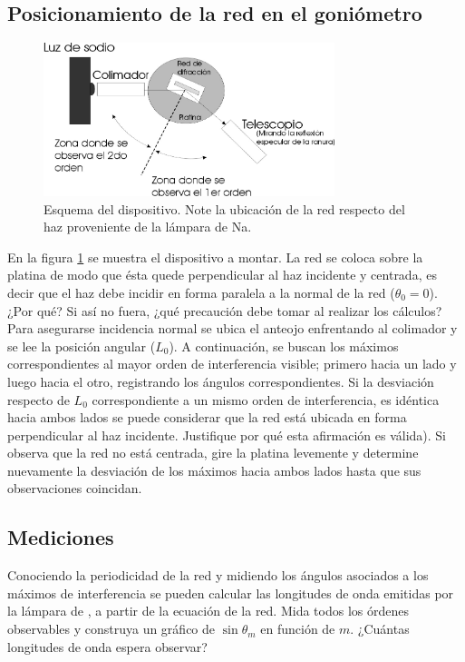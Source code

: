 \documentclass[laboratorio]{guia}
\begin{document}
\subsection{Posicionamiento de la red en el goniómetro} %
\begin{figure}[t!]
    \centering
    \includegraphics[width=8.5cm]{LG11--002.png}
    \caption{Esquema del dispositivo.
      Note la ubicación de la red respecto del haz proveniente de la lámpara de Na.
    }
    \label{fig:1}
\end{figure}
En la figura \ref{fig:1} se muestra el dispositivo a montar.
La red se coloca sobre la platina de modo que ésta quede perpendicular al haz incidente y centrada, es decir que el haz debe incidir en forma paralela a la normal de la red (\(\theta_0 = 0\)).
¿Por qué?
Si así no fuera, ¿qué precaución debe tomar al realizar los cálculos?
Para asegurarse incidencia normal se ubica el anteojo enfrentando al colimador y se lee la posición angular (\(L_0\)).
A continuación, se buscan los máximos correspondientes al mayor orden de interferencia visible; primero hacia un lado y luego hacia el otro, registrando los ángulos correspondientes.
Si la desviación respecto de \(L_0\) correspondiente a un mismo orden de interferencia, es idéntica hacia ambos lados se puede considerar que la red está ubicada en forma perpendicular al haz incidente.
Justifique por qué esta afirmación es válida).
Si observa que la red no está centrada, gire la platina levemente y determine nuevamente la desviación de los máximos hacia ambos lados hasta que sus observaciones coincidan.


\subsection{Mediciones}
  Conociendo la periodicidad de la red y midiendo los ángulos asociados a los  máximos de interferencia se pueden calcular las longitudes de onda emitidas por la lámpara de , a partir de la ecuación de la red.
  Mida todos los órdenes observables y construya un gráfico de \(\sin{\theta_m}\) en función de \(m\). 
  ¿Cuántas longitudes de onda espera observar?
        
\end{document}
